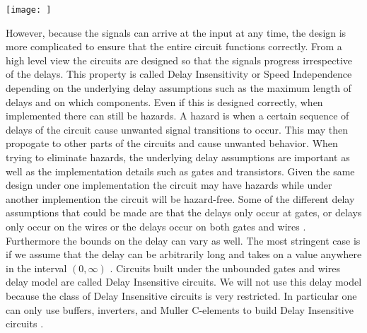 \documentclass[12pt]{report}
\begin{document}
\texttt{[image: ]}

However, because the signals can arrive at the input at any time, the design is more complicated to ensure that the entire circuit functions correctly.  From a high level view the circuits are designed so that the signals progress irrespective of the delays.  This property is called Delay Insensitivity or Speed Independence depending on the underlying delay assumptions such as the maximum length of delays and on which components.  Even if this is designed correctly, when implemented there can still be hazards.  A hazard is when a certain sequence of delays of the circuit cause unwanted signal transitions to occur.  This may then propogate to other parts of the circuits and cause unwanted behavior.  When trying to eliminate hazards, the underlying delay assumptions are important as well as the implementation details such as gates and transistors. Given the same design under one implementation the circuit may have hazards while under another implemention the circuit will be hazard-free.  Some of the different delay assumptions that could be made are that the delays only occur at gates, or delays only occur on the wires or the delays occur on both gates and wires \cite{myers_book_2004}. Furthermore the bounds on the delay can vary as well. The most stringent case is if we assume that the delay can be arbitrarily long and takes on a value anywhere in the interval $(0,\infty)$ \cite{myers_book_2004}.  Circuits built under the unbounded gates and wires delay model are called Delay Insensitive circuits.  We will not use this delay model because the class of Delay Insensitive circuits is very restricted.  In particular one can only use buffers, inverters, and Muller C-elements to build Delay Insensitive circuits \cite{Martin_1990_DI} \cite{Martin1986_DI}.\\ %
\end{document}
